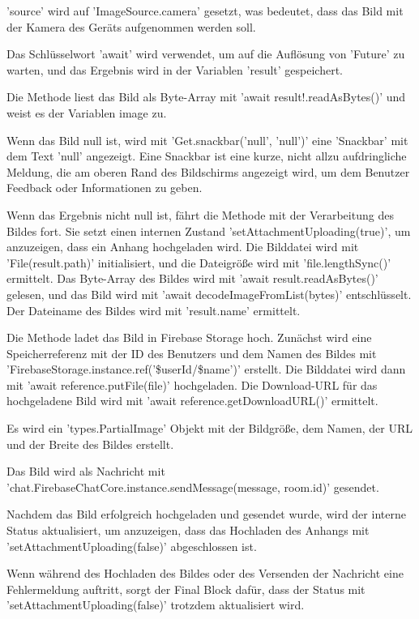 'source' wird auf 'ImageSource.camera' gesetzt, was bedeutet, dass das Bild mit der Kamera des Geräts aufgenommen werden soll.

Das Schlüsselwort 'await' wird verwendet, um auf die Auflösung von 'Future' zu warten, und das Ergebnis wird in der Variablen 'result' gespeichert.

Die Methode liest das Bild als Byte-Array mit 'await result!.readAsBytes()' und weist es der Variablen image zu.

Wenn das Bild null ist, wird mit 'Get.snackbar('null', 'null')' eine 'Snackbar' mit dem Text 'null' angezeigt. Eine Snackbar ist eine kurze, nicht allzu aufdringliche Meldung, die am oberen Rand des Bildschirms angezeigt wird, um dem Benutzer Feedback oder Informationen zu geben.

Wenn das Ergebnis nicht null ist, fährt die Methode mit der Verarbeitung des Bildes fort.
Sie setzt einen internen Zustand 'setAttachmentUploading(true)', um anzuzeigen, dass ein Anhang hochgeladen wird.
Die Bilddatei wird mit 'File(result.path)' initialisiert, und die Dateigröße wird mit 'file.lengthSync()' ermittelt.
Das Byte-Array des Bildes wird mit 'await result.readAsBytes()' gelesen, und das Bild wird mit 'await decodeImageFromList(bytes)' entschlüsselt.
Der Dateiname des Bildes wird mit 'result.name' ermittelt.

Die Methode ladet das Bild in Firebase Storage hoch.
Zunächst wird eine Speicherreferenz mit der ID des Benutzers und dem Namen des Bildes mit 'FirebaseStorage.instance.ref('\$userId/\$name')'  erstellt.
Die Bilddatei wird dann mit 'await reference.putFile(file)' hochgeladen.
Die Download-URL für das hochgeladene Bild wird mit 'await reference.getDownloadURL()' ermittelt.

Es wird ein 'types.PartialImage' Objekt mit der Bildgröße, dem Namen, der URL und der Breite des Bildes erstellt.

Das Bild wird als Nachricht mit 'chat.FirebaseChatCore.instance.sendMessage(message, room.id)' gesendet.

Nachdem das Bild erfolgreich hochgeladen und gesendet wurde, wird der interne Status aktualisiert, um anzuzeigen, dass das Hochladen des Anhangs mit 'setAttachmentUploading(false)' abgeschlossen ist.

Wenn während des Hochladen des Bildes oder des Versenden der Nachricht eine Fehlermeldung auftritt, sorgt der Final Block dafür, dass der Status mit 'setAttachmentUploading(false)' trotzdem aktualisiert wird.


